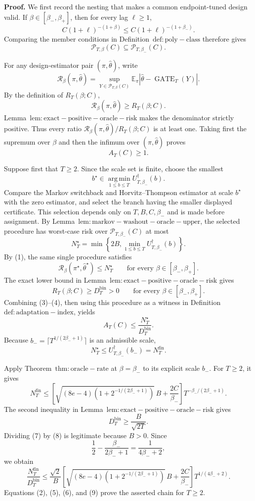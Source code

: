 \textbf{Proof.} We first record the nesting that makes a common endpoint-tuned design valid. If \(\beta\in[\beta_-,\beta_+]\), then for every lag \(\ell\ge1\),
\[
C(1+\ell)^{-(1+\beta)}\le C(1+\ell)^{-(1+\beta_-)}.
\]
Comparing the member conditions in Definition~\(\mathrm{def:poly-class}\) therefore gives
\[
\mathcal P_{T,\beta}(C)\subseteq\mathcal P_{T,\beta_-}(C).
\tag{1}
\]

For any design-estimator pair \((\pi,\widehat\theta)\), write
\[
\mathcal R_\beta(\pi,\widehat\theta)
=\sup_{Y\in\mathcal P_{T,\beta}(C)}
\mathbb E_\pi\left\lvert\widehat\theta-\operatorname{GATE}_T(Y)\right\rvert.
\]
By the definition of \(R_T(\beta;C)\),
\[
\mathcal R_\beta(\pi,\widehat\theta)\ge R_T(\beta;C).
\]
Lemma~\(\mathrm{lem:exact-positive-oracle-risk}\) makes the denominator strictly positive. Thus every ratio \(\mathcal R_\beta(\pi,\widehat\theta)/R_T(\beta;C)\) is at least one. Taking first the supremum over \(\beta\) and then the infimum over \((\pi,\widehat\theta)\) proves
\[
A_T(C)\ge1.
\tag{2}
\]

Suppose first that \(T\ge2\). Since the scale set is finite, choose the smallest
\[
b^\star\in\operatorname*{arg\,min}_{1\le b\le T}U_{T,\beta_-}^{\dagger}(b).
\]
Compare the Markov switchback and Horvitz--Thompson estimator at scale \(b^\star\) with the zero estimator, and select the branch having the smaller displayed certificate. This selection depends only on \(T,B,C,\beta_-\) and is made before assignment. By Lemma~\(\mathrm{lem:markov-washout-oracle-upper}\), the selected procedure has worst-case risk over \(\mathcal P_{T,\beta_-}(C)\) at most
\[
N_T^\star=\min\left\{2B,\min_{1\le b\le T}U_{T,\beta_-}^{\dagger}(b)\right\}.
\]
By (1), the same single procedure satisfies
\[
\mathcal R_\beta(\pi^\star,\widehat\theta^\star)\le N_T^\star
\qquad\text{for every }\beta\in[\beta_-,\beta_+].
\tag{3}
\]
The exact lower bound in Lemma~\(\mathrm{lem:exact-positive-oracle-risk}\) gives
\[
R_T(\beta;C)\ge D_T^{\mathrm{bin}}>0
\qquad\text{for every }\beta\in[\beta_-,\beta_+].
\tag{4}
\]
Combining (3)--(4), then using this procedure as a witness in Definition~\(\mathrm{def:adaptation-index}\), yields
\[
A_T(C)\le\frac{N_T^\star}{D_T^{\mathrm{bin}}}.
\tag{5}
\]
Because \(b_-=\lceil T^{1/(2\beta_-+1)}\rceil\) is an admissible scale,
\[
N_T^\star\le U_{T,\beta_-}^{\dagger}(b_-)=N_T^{\mathrm{fin}}.
\tag{6}
\]

Apply Theorem~\(\mathrm{thm:oracle-rate}\) at \(\beta=\beta_-\) to its explicit scale \(b_-\). For \(T\ge2\), it gives
\[
N_T^{\mathrm{fin}}
\le\left[\sqrt{(8e-4)\left(1+2^{-1/(2\beta_-+1)}\right)}\,B+\frac{2C}{\beta_-}\right]
T^{-\beta_-/(2\beta_-+1)}.
\tag{7}
\]
The second inequality in Lemma~\(\mathrm{lem:exact-positive-oracle-risk}\) gives
\[
D_T^{\mathrm{bin}}\ge\frac{B}{\sqrt{2T}}.
\tag{8}
\]
Dividing (7) by (8) is legitimate because \(B>0\). Since
\[
\frac12-\frac{\beta_-}{2\beta_-+1}=\frac{1}{4\beta_-+2},
\]
we obtain
\[
\frac{N_T^{\mathrm{fin}}}{D_T^{\mathrm{bin}}}
\le\frac{\sqrt2}{B}
\left[\sqrt{(8e-4)\left(1+2^{-1/(2\beta_-+1)}\right)}\,B+\frac{2C}{\beta_-}\right]
T^{1/(4\beta_-+2)}.
\tag{9}
\]
Equations (2), (5), (6), and (9) prove the asserted chain for \(T\ge2\).

